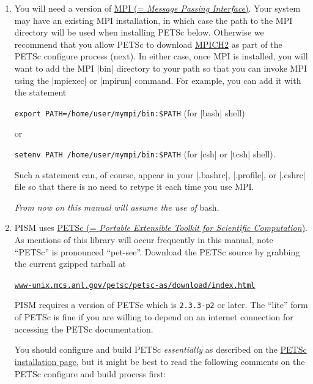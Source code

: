 \documentclass[11pt,final]{amsart}
\newcommand{\PETSCREL}{2.3.3-p2}
\renewcommand{\t}[1]{\texttt{#1}}
\begin{document}
\begin{enumerate}
\item You will need a version of \href{http://www-unix.mcs.anl.gov/mpi/}{MPI (= \emph{Message Passing Interface})}. Your system may have an existing MPI installation, in which case the path to the MPI
  directory will be used when installing PETSc below. Otherwise we recommend that you allow PETSc to download
  \href{http://www-unix.mcs.anl.gov/mpi/mpich2/}{MPICH2} as part of the PETSc configure process (next). In either case, once MPI
  is installed, you will want to add the MPI |bin| directory to your path so that you can invoke MPI using the |mpiexec|
  or |mpirun| command. For example, you can add it with the statement

\verb|export PATH=/home/user/mympi/bin:$PATH|  \qquad (for |bash| shell)

\noindent or

\verb|setenv PATH /home/user/mympi/bin:$PATH|  \qquad (for |csh| or |tcsh| shell).

\noindent Such a statement can, of course, appear in your |.bashrc|, |.profile|, or |.cshrc| file so that there is
no need to retype it each time you use MPI.

\medskip
\begin{center}
  \emph{From now on this manual will assume the use of} bash.
\end{center}
\medskip

\item PISM uses \href{http://www-unix.mcs.anl.gov/petsc/petsc-2/index.html}{PETSc (= \emph{Portable Extensible Toolkit for
      Scientific Computation})}. As mentions of this
  library will occur frequently in this manual, note ``PETSc'' is pronounced ``pet-see''. Download the PETSc source by grabbing
  the current gzipped tarball at
   \begin{center}
    \href{http://www-unix.mcs.anl.gov/petsc/petsc-as/download/index.html}{\t{www-unix.mcs.anl.gov/petsc/petsc-as/download/index.html}}
  \end{center}
  PISM requires a version of PETSc which is \texttt{\PETSCREL} or later. The ``lite'' form of PETSc is fine if you are willing to
  depend on an internet connection for accessing the PETSc documentation.

  You should configure and build PETSc \emph{essentially} as described on the
  \href{http://www-unix.mcs.anl.gov/petsc/petsc-2/documentation/installation.html}{PETSc installation page}, but it might be best
  to read the following comments on the PETSc configure and build process first:


\end{enumerate}
\end{document}
